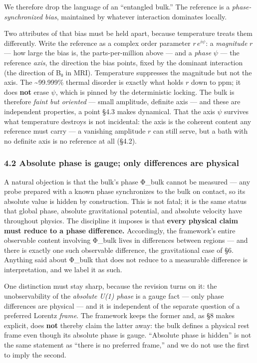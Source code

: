 \documentclass[
]{article}
\begin{document}
We therefore drop the language of an ``entangled bulk.'' The reference
is a \emph{phase-synchronized bias}, maintained by whatever interaction
dominates locally.

Two attributes of that bias must be held apart, because temperature
treats them differently. Write the reference as a complex order
parameter \(r\,e^{i\psi}\): a \emph{magnitude} \(r\) --- how large the
bias is, the parts-per-million above --- and a \emph{phase} \(\psi\) ---
the reference \emph{axis}, the direction the bias points, fixed by the
dominant interaction (the direction of B₀ in MRI). Temperature
suppresses the magnitude but not the axis. The \textasciitilde99.999\%
thermal disorder is exactly what holds \(r\) down to ppm; it does
\textbf{not} erase \(\psi\), which is pinned by the deterministic
locking. The bulk is therefore \emph{faint but oriented} --- small
amplitude, definite axis --- and these are independent properties, a
point §4.3 makes dynamical. That the axis \(\psi\) survives what
temperature destroys is not incidental: the axis is the coherent content
any reference must carry --- a vanishing amplitude \(r\) can still
serve, but a bath with no definite axis is no reference at all (§4.2).

\subsubsection{4.2 Absolute phase is gauge; only differences are
physical}\label{absolute-phase-is-gauge-only-differences-are-physical}

A natural objection is that the bulk's phase Φ\_bulk cannot be measured
--- any probe prepared with a known phase synchronizes to the bulk on
contact, so its absolute value is hidden by construction. This is not
fatal; it is the same status that global phase, absolute gravitational
potential, and absolute velocity have throughout physics. The discipline
it imposes is that \textbf{every physical claim must reduce to a phase
difference.} Accordingly, the framework's entire observable content
involving Φ\_bulk lives in differences between regions --- and there is
exactly one such observable difference, the gravitational case of §6.
Anything said about Φ\_bulk that does not reduce to a measurable
difference is interpretation, and we label it as such.

One distinction must stay sharp, because the revision turns on it: the
unobservability of the \emph{absolute U(1) phase} is a gauge fact ---
only phase differences are physical --- and it is independent of the
separate question of a preferred Lorentz \emph{frame}. The framework
keeps the former and, as §8 makes explicit, does \textbf{not} thereby
claim the latter away: the bulk defines a physical rest frame even
though its absolute phase is gauge. ``Absolute phase is hidden'' is not
the same statement as ``there is no preferred frame,'' and we do not use
the first to imply the second.
\end{document}
